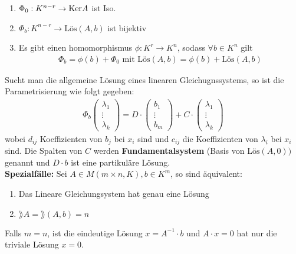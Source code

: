 \begin{enumerate}[{(}1{.)}]
    \item	$\Phi_0: K^{n-r} \rightarrow \text{Ker} A$ ist Iso.
    
    \item $\Phi_b: K^{n-r} \rightarrow \text{Lös}(A,b)$ ist  bijektiv
    
    \item Es gibt einen homomorphismus $\phi: K^r \rightarrow K^n$, sodass $\forall b \in K^n$ gilt
    \begin{align*}
        \Phi_b = \phi(b) + \Phi_0 \text{ mit } \text{Lös}(A,b) = \phi(b) + \text{Lös}(A,b)
    \end{align*}
\end{enumerate}
Sucht man die allgemeine Lösung eines linearen Gleichugnssystems, so ist die Parametrisierung wie folgt gegeben:
\begin{align*}
    \Phi_b \begin{pmatrix}
    \lambda_{1} \\ \vdots \\	 \lambda_{k}
    \end{pmatrix} = D \cdot \begin{pmatrix}
    b_{1} \\ \vdots \\	 b_{m}
    \end{pmatrix}
    + C \cdot \begin{pmatrix}
    \lambda_{1} \\ \vdots \\	 \lambda_{k}
    \end{pmatrix}
\end{align*}
wobei $d_{ij}$ Koeffizienten von $b_j$ bei $x_i$ sind und $c_{ij}$ die Koeffizienten von $\lambda_i$ bei $x_i$ sind. Die Spalten von $C$ werden \textbf{Fundamentalsystem} (Basis von $\text{Lös}(A,0))$ genannt und $D \cdot b$ ist eine partikuläre Lösung.\\
\textbf{Spezialfälle:} Sei $A \in M(m\times n,K), b \in K^m$, so sind äquivalent:
\begin{enumerate}[{(}i{)}]
    \item Das Lineare Gleichungsystem hat genau eine Lösung
    
    \item $\rang A = \rang (A,b) = n$
\end{enumerate}
Falls $m = n$, ist die eindeutige Lösung $x = A^{-1}\cdot b$ und $A \cdot x = 0$ hat nur die triviale Lösung $x = 0$. \\
